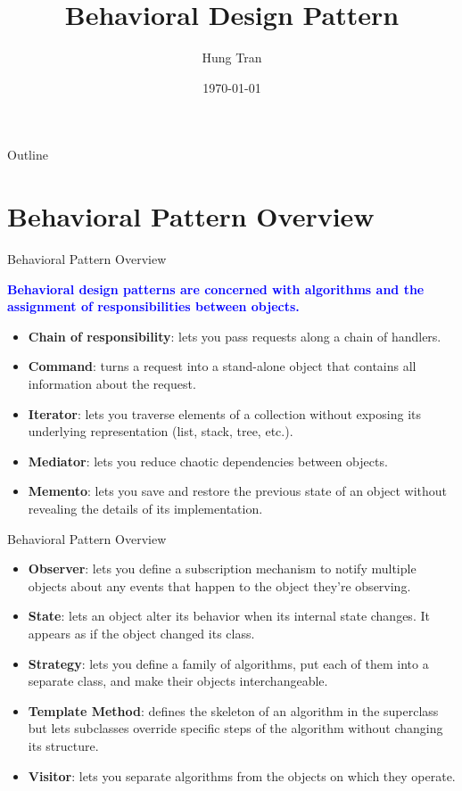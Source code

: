 \documentclass[13pt]{beamer}
\title[Design Pattern]{Behavioral Design Pattern}
\author{Hung Tran}
\institute{Fpt software}
\date{\today}
\begin{document}
\begin{frame}
\titlepage
\end{frame}

\begin{frame}{Outline}
\tableofcontents
\end{frame}

\section{Behavioral Pattern Overview}

\begin{frame}{Behavioral Pattern Overview}
	\begin{center}
	\textcolor{blue}{\textbf{Behavioral design patterns are concerned with algorithms and the assignment of responsibilities between objects.}}
	\end{center}
	\begin{itemize}
		\item \textbf{Chain of responsibility}: lets you pass requests along a chain of handlers.
		\item \textbf{Command}: turns a request into a stand-alone object that contains all information about the request.
		\item \textbf{Iterator}: lets you traverse elements of a collection without exposing its underlying representation (list, stack, tree, etc.).
		\item \textbf{Mediator}: lets you reduce chaotic dependencies between objects.
		\item \textbf{Memento}: lets you save and restore the previous state of an object without revealing the details of its implementation.
	\end{itemize}
\end{frame}

\begin{frame}{Behavioral Pattern Overview}
	\begin{itemize}
		\item \textbf{Observer}: lets you define a subscription mechanism to notify multiple objects about any events that happen to the object they’re observing.
		\item \textbf{State}: lets an object alter its behavior when its internal state changes. It appears as if the object changed its class.
		\item \textbf{Strategy}: lets you define a family of algorithms, put each of them into a separate class, and make their objects interchangeable.
		\item \textbf{Template Method}: defines the skeleton of an algorithm in the superclass but lets subclasses override specific steps of the algorithm without changing its structure.
		\item \textbf{Visitor}: lets you separate algorithms from the objects on which they operate.
	\end{itemize}
\end{frame}
\end{document}
